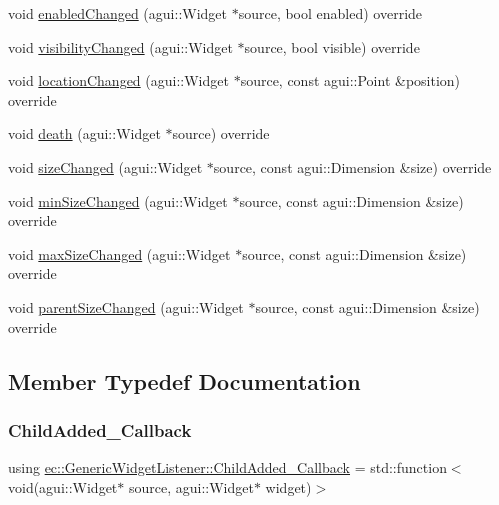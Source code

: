\begin{DoxyCompactItemize}
void \mbox{\hyperlink{classec_1_1_generic_widget_listener_a0d25da5c3238a159301ccedfc356835c}{enabled\+Changed}} (agui\+::\+Widget $\ast$source, bool enabled) override
\item 
void \mbox{\hyperlink{classec_1_1_generic_widget_listener_a6f9e7db28e619ab8c538152972fe6c97}{visibility\+Changed}} (agui\+::\+Widget $\ast$source, bool visible) override
\item 
void \mbox{\hyperlink{classec_1_1_generic_widget_listener_a030090089623f7cae136d619e67a075d}{location\+Changed}} (agui\+::\+Widget $\ast$source, const agui\+::\+Point \&position) override
\item 
void \mbox{\hyperlink{classec_1_1_generic_widget_listener_a528f121d3af10fea1e966a5d8baa86f5}{death}} (agui\+::\+Widget $\ast$source) override
\item 
void \mbox{\hyperlink{classec_1_1_generic_widget_listener_a8566ffeb05ef271dc60c7b5215efca21}{size\+Changed}} (agui\+::\+Widget $\ast$source, const agui\+::\+Dimension \&size) override
\item 
void \mbox{\hyperlink{classec_1_1_generic_widget_listener_af3cb291bf020116053ee7955d40bc786}{min\+Size\+Changed}} (agui\+::\+Widget $\ast$source, const agui\+::\+Dimension \&size) override
\item 
void \mbox{\hyperlink{classec_1_1_generic_widget_listener_ae1341f57e8a72d4222d855031301f346}{max\+Size\+Changed}} (agui\+::\+Widget $\ast$source, const agui\+::\+Dimension \&size) override
\item 
void \mbox{\hyperlink{classec_1_1_generic_widget_listener_ac028b637c04e199f30769df5bc30a0b2}{parent\+Size\+Changed}} (agui\+::\+Widget $\ast$source, const agui\+::\+Dimension \&size) override
\end{DoxyCompactItemize}


\subsection{Member Typedef Documentation}
\mbox{\label{classec_1_1_generic_widget_listener_ae374d6d8d2ca9eac9e362a2e587b6ae5}} 
\subsubsection{\texorpdfstring{Child\+Added\+\_\+\+Callback}{ChildAdded\_Callback}}
{\footnotesize\ttfamily using \mbox{\hyperlink{classec_1_1_generic_widget_listener_ae374d6d8d2ca9eac9e362a2e587b6ae5}{ec\+::\+Generic\+Widget\+Listener\+::\+Child\+Added\+\_\+\+Callback}} =  std\+::function$<$void(agui\+::\+Widget$\ast$ source, agui\+::\+Widget$\ast$ widget)$>$}

